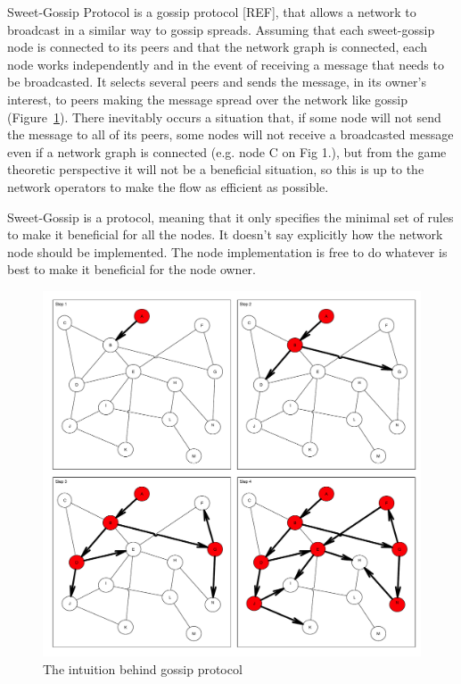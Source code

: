 \documentclass{article}
\begin{document}
Sweet-Gossip Protocol is a gossip protocol [REF], that allows a network to broadcast in a similar way to gossip spreads. Assuming that each sweet-gossip node is connected to its peers and that the network graph is connected, each node works independently and in the event of receiving a message that needs to be broadcasted. It selects several peers and sends the message, in its owner's interest, to peers making the message spread over the network like gossip (Figure~\ref{fig:network}). There inevitably occurs a situation that, if some node will not send the message to all of its peers, some nodes will not receive a broadcasted message even if a network graph is connected (e.g. node C on Fig 1.), but from the game theoretic perspective it will not be a beneficial situation, so this is up to the network operators to make the flow as efficient as possible.

Sweet-Gossip is a protocol, meaning that it only specifies the minimal set of rules to make it beneficial for all the nodes. It doesn't say explicitly how the network node should be implemented. The node implementation is free to do whatever is best to make it beneficial for the node owner.

\begin{figure}
	\centering
	\includegraphics[scale=0.4]{network.pdf}
	\caption{The intuition behind gossip protocol}
	\label{fig:network}
\end{figure}
\end{document}
